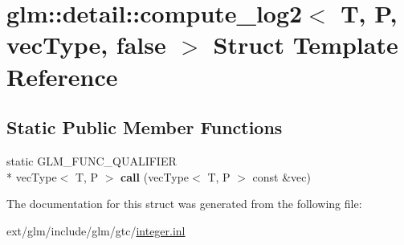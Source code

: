 \hypertarget{structglm_1_1detail_1_1compute__log2_3_01_t_00_01_p_00_01vec_type_00_01false_01_4}{\section{glm\-:\-:detail\-:\-:compute\-\_\-log2$<$ T, P, vec\-Type, false $>$ Struct Template Reference}
\label{structglm_1_1detail_1_1compute__log2_3_01_t_00_01_p_00_01vec_type_00_01false_01_4}
}
\subsection*{Static Public Member Functions}
\begin{DoxyCompactItemize}
\item 
\hypertarget{structglm_1_1detail_1_1compute__log2_3_01_t_00_01_p_00_01vec_type_00_01false_01_4_ad2408ae0974d10cf652be563bcc29789}{static G\-L\-M\-\_\-\-F\-U\-N\-C\-\_\-\-Q\-U\-A\-L\-I\-F\-I\-E\-R \\*
vec\-Type$<$ T, P $>$ {\bfseries call} (vec\-Type$<$ T, P $>$ const \&vec)}\label{structglm_1_1detail_1_1compute__log2_3_01_t_00_01_p_00_01vec_type_00_01false_01_4_ad2408ae0974d10cf652be563bcc29789}

\end{DoxyCompactItemize}


The documentation for this struct was generated from the following file\-:\begin{DoxyCompactItemize}
\item 
ext/glm/include/glm/gtc/\hyperlink{gtc_2integer_8inl}{integer.\-inl}\end{DoxyCompactItemize}
